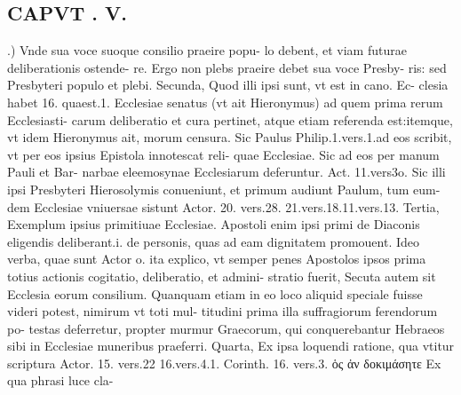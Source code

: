 \documentclass{article}
\begin{document}
\begin{pages}
\section*{CAPVT . V. }
\marginpar{[ p.353 ]}.) Vnde sua voce suoque consilio praeire popu- lo debent, et viam futurae deliberationis ostende- re. Ergo non plebs praeire debet sua voce Presby- ris: sed Presbyteri populo et plebi. Secunda, Quod illi ipsi sunt, vt est in cano. Ec- clesia habet 16. quaest.1. Ecclesiae senatus (vt ait Hieronymus) ad quem prima rerum Ecclesiasti- carum deliberatio et cura pertinet, atque etiam referenda est:itemque, vt idem Hieronymus ait, morum censura. Sic Paulus Philip.1.vers.1.ad eos scribit, vt per eos ipsius Epistola innotescat reli- quae Ecclesiae. Sic ad eos per manum Pauli et Bar- narbae eleemosynae Ecclesiarum deferuntur. Act. 11.vers3o. Sic illi ipsi Presbyteri Hierosolymis conueniunt, et primum audiunt Paulum, tum eum- dem Ecclesiae vniuersae sistunt Actor. 20. vers.28. 21.vers.18.11.vers.13. Tertia, Exemplum ipsius primitiuae Ecclesiae. Apostoli enim ipsi primi de Diaconis eligendis deliberant.i. de personis, quas ad eam dignitatem promouent. Ideo verba, quae sunt Actor o. ita explico, vt semper penes Apostolos ipsos prima totius actionis cogitatio, deliberatio, et admini- stratio fuerit, Secuta autem sit Ecclesia eorum consilium. Quanquam etiam in eo loco aliquid speciale fuisse videri potest, nimirum vt toti mul- titudini prima illa suffragiorum ferendorum po- testas deferretur, propter murmur Graecorum, qui conquerebantur Hebraeos sibi in Ecclesiae muneribus praeferri. Quarta, Ex ipsa loquendi ratione, qua vtitur scriptura Actor. 15. vers.22 16.vers.4.1. Corinth. 16. vers.3. ὁς ἀν δοκιμάσητε Ex qua phrasi luce cla-  \pend

\end{pages}
\end{document}
